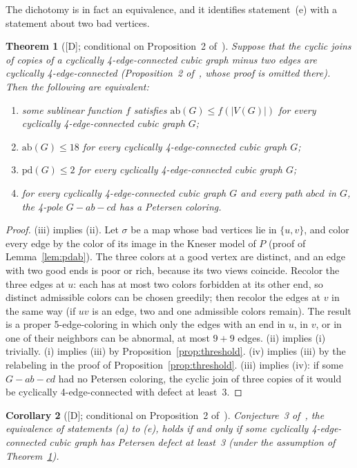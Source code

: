 \documentclass[11pt]{article}
\newtheorem{theorem}{Theorem}[section]
\newtheorem{corollary}[theorem]{Corollary}
\theoremstyle{definition}
\theoremstyle{remark}
\newcommand{\PG}{P}
\newcommand{\pd}{\mathrm{pd}}
\newcommand{\ab}{\mathrm{ab}}
\newcommand{\dd}{\textup{[D]}}
\begin{document}
The dichotomy is in fact an equivalence, and it identifies statement~(e) with a statement about
two bad vertices.

\begin{theorem}[\dd; conditional on Proposition~2 of~\cite{MMM2021}]\label{thm:twodefect}
Suppose that the cyclic joins of copies of a cyclically 4-edge-connected cubic graph minus two
edges are cyclically 4-edge-connected (Proposition~2 of~\cite{MMM2021}, whose proof is omitted
there). Then the following are equivalent:
\begin{enumerate}
\item[\textup{(i)}] some sublinear function $f$ satisfies $\ab(G) \le f(|V(G)|)$ for every
cyclically 4-edge-connected cubic graph $G$;
\item[\textup{(ii)}] $\ab(G) \le 18$ for every cyclically 4-edge-connected cubic graph $G$;
\item[\textup{(iii)}] $\pd(G) \le 2$ for every cyclically 4-edge-connected cubic graph $G$;
\item[\textup{(iv)}] for every cyclically 4-edge-connected cubic graph $G$ and every path $abcd$ in
$G$, the 4-pole $G - ab - cd$ has a Petersen coloring.
\end{enumerate}
\end{theorem}

\begin{proof}
(iii) implies (ii). Let $\sigma$ be a map whose bad vertices lie in $\{u, v\}$, and color every
edge by the color of its image in the Kneser model of $\PG$ (proof of Lemma~\ref{lem:pdab}). The
three colors at a good vertex are distinct, and an edge with two good ends is poor or rich,
because its two views coincide. Recolor the three edges at $u$: each has at most two colors
forbidden at its other end, so distinct admissible colors can be chosen greedily; then recolor the
edges at $v$ in the same way (if $uv$ is an edge, two and one admissible colors remain). The
result is a proper 5-edge-coloring in which only the edges with an end in $u$, in $v$, or in one
of their neighbors can be abnormal, at most $9 + 9$ edges. (ii) implies (i) trivially. (i)
implies (iii) by Proposition~\ref{prop:threshold}. (iv) implies (iii) by the relabeling in the
proof of Proposition~\ref{prop:threshold}. (iii) implies (iv): if some $G - ab - cd$ had no
Petersen coloring, the cyclic join of three copies of it would be cyclically 4-edge-connected
with defect at least~3.
\end{proof}

\begin{corollary}[\dd; conditional on Proposition~2 of~\cite{MMM2021}]\label{cor:mmm}
Conjecture~3 of~\cite{MMM2021}, the equivalence of statements (a) to (e), holds if and only if
some cyclically 4-edge-connected cubic graph has Petersen defect at least~3 (under the assumption
of Theorem~\ref{thm:twodefect}).
\end{corollary}
\end{document}
